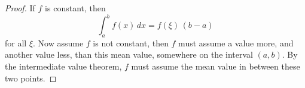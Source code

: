 

\begin{proof}
If $f$ is constant, then  
$$
\int_a^b f(x)\,dx = f(\xi)\,(b-a) 
$$
for all $\xi$. Now assume $f$ is not constant, then $f$ must assume 
a value more, and another value less, than this mean value, 
somewhere on the interval $(a,b)$. By the intermediate value theorem, 
$f$ must assume the mean value in between these two points.

\end{proof}

